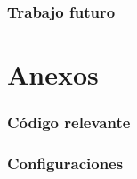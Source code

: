 \documentclass[a4paper,11pt]{memoir}
\begin{document}
\subsection{Trabajo futuro}

\chapter{Anexos}
\subsection{Código relevante}

%
\subsection{Configuraciones}

%
%


\appendix
\backmatter

\printbibliography
\end{document}
